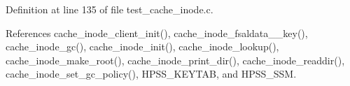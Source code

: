 Definition at line 135 of file test\_\-cache\_\-inode.c.

References cache\_\-inode\_\-client\_\-init(), cache\_\-inode\_\-fsaldata\_\_\-key(), cache\_\-inode\_\-gc(), cache\_\-inode\_\-init(), cache\_\-inode\_\-lookup(), cache\_\-inode\_\-make\_\-root(), cache\_\-inode\_\-print\_\-dir(), cache\_\-inode\_\-readdir(), cache\_\-inode\_\-set\_\-gc\_\-policy(), HPSS\_\-KEYTAB, and HPSS\_\-SSM.